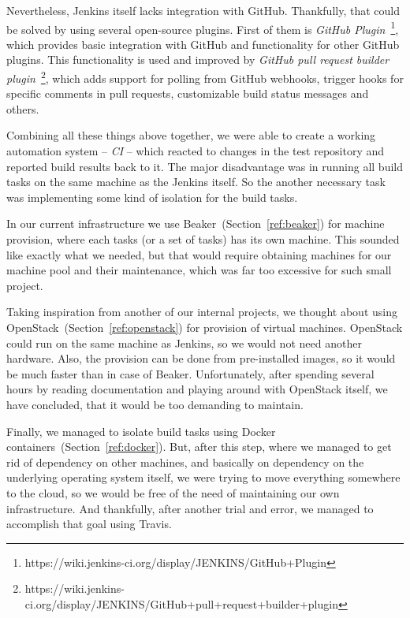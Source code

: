     Nevertheless, Jenkins itself lacks integration with GitHub. Thankfully, that
    could be solved by using several open-source plugins. First of them is
    \textit{GitHub Plugin}~\footnote{https://wiki.jenkins-ci.org/display/JENKINS/GitHub+Plugin},
    which provides basic integration with GitHub and functionality for other
    GitHub plugins. This functionality is used and improved by
    \textit{GitHub pull request builder plugin}~\footnote{https://wiki.jenkins-ci.org/display/JENKINS/GitHub+pull+request+builder+plugin},
    which adds support for polling from GitHub webhooks, trigger hooks for
    specific comments in pull requests, customizable build status messages and
    others.

    Combining all these things above together, we were able to create a working
    automation system -- \textit{CI} -- which reacted to changes in the test
    repository and reported build results back to it. The major disadvantage
    was in running all build tasks on the same machine as the Jenkins itself.
    So the another necessary task was implementing some kind of isolation
    for the build tasks.

    In our current infrastructure we use Beaker~(Section~\ref{ref:beaker}) for machine
    provision, where each tasks (or a set of tasks) has its own machine. This sounded like exactly
    what we needed, but that would require obtaining machines for our machine pool
    and their maintenance, which was far too excessive for such small project.

    Taking inspiration from another of our internal projects, we thought about
    using OpenStack~(Section~\ref{ref:openstack}) for provision of virtual
    machines. OpenStack could run on the same machine as Jenkins, so we would not
    need another hardware. Also, the provision can be done from pre-installed
    images, so it would be much faster than in case of Beaker. Unfortunately,
    after spending several hours by reading documentation and playing around with
    OpenStack itself, we have concluded, that it would be too demanding
    to maintain.

    Finally, we managed to isolate build tasks using Docker containers~(Section~\ref{ref:docker}).
    But, after this step, where we managed to get rid of dependency on other machines,
    and basically on dependency on the underlying operating system itself, we
    were trying to move everything somewhere to the cloud, so we would be free
    of the need of maintaining our own infrastructure. And thankfully, after
    another trial and error, we managed to accomplish that goal using Travis.

